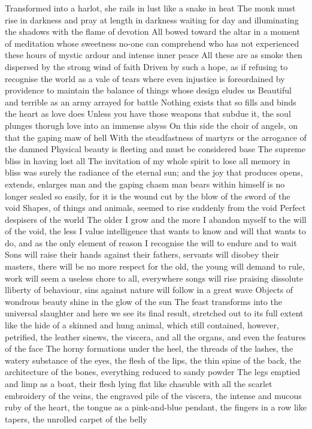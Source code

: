 \documentclass{article}
\begin{document}
\iffalse
Transformed into a harlot, she rails in lust like a snake in heat
The monk must rise in darkness and pray at length in darkness waiting for day and illuminating the shadows with the flame of devotion
All bowed toward the altar in a moment of meditation whose sweetness no-one can comprehend who has not experienced these hours of mystic ardour and intense inner peace
All these are as smoke then dispersed by the strong wind of faith
Driven by such a hope, as if refusing to recognise the world as a vale of tears where even injustice is foreordained by providence to maintain the balance of things whose design eludes us
Beautiful and terrible as an army arrayed for battle
Nothing exists that so fills and binds the heart as love does
Unless you have those weapons that subdue it, the soul plunges thorugh love into an immense abyss
On this side the choir of angels, on that the gaping maw of hell
With the steadfastness of martyrs or the arrogance of the damned
Physical beauty is fleeting and must be considered base
The supreme bliss in having lost all
The invitation of my whole spirit to lose all memory in bliss was surely the radiance of the eternal sun; and the joy that produces opens, extends, enlarges man and the gaping chasm man bears within himself is no longer sealed so easily, for it is the wound cut by the blow of the sword of the void
Shapes, of things and animals, seemed to rise suddenly from the void
Perfect despisers of the world
The older I grow and the more I abandon myself to the will of the void, the less I value intelligence that wants to know and will that wants to do, and as the only element of reason I recognise the will to endure and to wait
Sons will raise their hands against their fathers, servants will disobey their masters, there will be no more respect for the old, the young will demand to rule, work will seem a useless chore to all, everywhere songs will rise praising dissolute lliberty of behaviour, sins against nature will follow in a great wave
Objects of wondrous beauty shine in the glow of the sun
The feast transforms into the universal slaughter and here we see its final result, stretched out to its full extent like the hide of a skinned and hung animal, which still contained, however, petrified, the leather sinews, the viscera, and all the organs, and even the features of the face
The horny formations under the heel, the threads of the lashes, the watery substance of the eyes, the flesh of the lips, the thin spine of the back, the architecture of the bones, everything reduced to sandy powder
The legs emptied and limp as a boat, their flesh lying flat like chasuble with all the scarlet embroidery of the veins, the engraved pile of the viscera, the intense and mucous ruby of the heart, the tongue as a pink-and-blue pendant, the fingers in a row like tapers, the unrolled carpet of the belly
\end{document}
